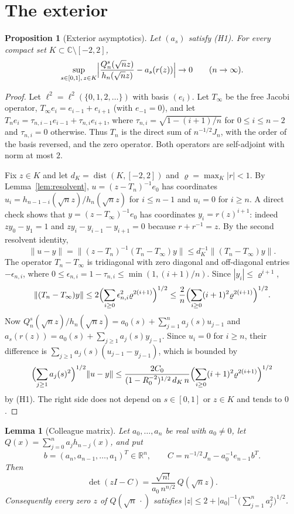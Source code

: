 \documentclass[11pt]{amsart}
\newtheorem{proposition}[theorem]{Proposition}
\newtheorem{lemma}[theorem]{Lemma}
\theoremstyle{definition}
\theoremstyle{remark}
\numberwithin{equation}{section}
\newcommand{\C}{\mathbb{C}}
\newcommand{\R}{\mathbb{R}}
\DeclareMathOperator{\dist}{dist}
\begin{document}
\section{The exterior}\label{sec:exterior}

\begin{proposition}[Exterior asymptotics]\label{prop:exterior}
Let $(a_s)$ satisfy (H1). For every compact set $K\subset\C\setminus[-2,2]$,
\[
\sup_{s\in[0,1],\,z\in K}\Bigl|\frac{Q_n^s(\sqrt nz)}{h_n(\sqrt nz)}-a_s(r(z))\Bigr|\to0\qquad(n\to\infty).
\]
\end{proposition}

\begin{proof}
Let $\ell^2=\ell^2(\{0,1,2,\dots\})$ with basis $(e_i)$. Let $T_\infty$ be the free Jacobi operator, $T_\infty e_i=e_{i-1}+e_{i+1}$ (with $e_{-1}=0$), and let $T_n e_i=\tau_{n,i-1}e_{i-1}+\tau_{n,i}e_{i+1}$, where $\tau_{n,i}=\sqrt{1-(i+1)/n}$ for $0\le i\le n-2$ and $\tau_{n,i}=0$ otherwise. Thus $T_n$ is the direct sum of $n^{-1/2}J_n$, with the order of the basis reversed, and the zero operator. Both operators are self-adjoint with norm at most $2$.

Fix $z\in K$ and let $d_K=\dist(K,[-2,2])$ and $\varrho=\max_K|r|<1$. By Lemma~\ref{lem:resolvent}, $u=(z-T_n)^{-1}e_0$ has coordinates $u_i=h_{n-1-i}(\sqrt nz)/h_n(\sqrt nz)$ for $i\le n-1$ and $u_i=0$ for $i\ge n$. A direct check shows that $y=(z-T_\infty)^{-1}e_0$ has coordinates $y_i=r(z)^{i+1}$: indeed $zy_0-y_1=1$ and $zy_i-y_{i-1}-y_{i+1}=0$ because $r+r^{-1}=z$. By the second resolvent identity,
\[
\|u-y\|=\|(z-T_n)^{-1}(T_n-T_\infty)y\|\le d_K^{-1}\|(T_n-T_\infty)y\|.
\]
The operator $T_n-T_\infty$ is tridiagonal with zero diagonal and off-diagonal entries $-\epsilon_{n,i}$, where $0\le\epsilon_{n,i}=1-\tau_{n,i}\le\min(1,(i+1)/n)$. Since $|y_i|\le\varrho^{i+1}$,
\[
\|(T_n-T_\infty)y\|\le2\Bigl(\sum_{i\ge0}\epsilon_{n,i}^2\varrho^{2(i+1)}\Bigr)^{1/2}\le\frac2n\Bigl(\sum_{i\ge0}(i+1)^2\varrho^{2(i+1)}\Bigr)^{1/2}.
\]
Now $Q_n^s(\sqrt nz)/h_n(\sqrt nz)=a_0(s)+\sum_{j=1}^{n}a_j(s)u_{j-1}$ and $a_s(r(z))=a_0(s)+\sum_{j\ge1}a_j(s)y_{j-1}$. Since $u_i=0$ for $i\ge n$, their difference is $\sum_{j\ge1}a_j(s)(u_{j-1}-y_{j-1})$, which is bounded by
\[
\Bigl(\sum_{j\ge1}a_j(s)^2\Bigr)^{1/2}\|u-y\|\le\frac{2C_0}{(1-R_0^{-2})^{1/2}\,d_K\,n}\Bigl(\sum_{i\ge0}(i+1)^2\varrho^{2(i+1)}\Bigr)^{1/2}
\]
by (H1). The right side does not depend on $s\in[0,1]$ or $z\in K$ and tends to $0$.
\end{proof}

\begin{lemma}[Colleague matrix]\label{lem:colleague}
Let $a_0,\dots,a_n$ be real with $a_0\neq0$, let $Q(x)=\sum_{j=0}^{n}a_jh_{n-j}(x)$, and put
\[
b=(a_n,a_{n-1},\dots,a_1)^T\in\R^n,\qquad C=n^{-1/2}J_n-a_0^{-1}e_{n-1}b^T .
\]
Then
\[
\det(zI-C)=\frac{\sqrt{n!}}{a_0\,n^{n/2}}\,Q(\sqrt nz).
\]
Consequently every zero $z$ of $Q(\sqrt n\,\cdot)$ satisfies $|z|\le2+|a_0|^{-1}\bigl(\sum_{j=1}^{n}a_j^2\bigr)^{1/2}$.
\end{lemma}
\end{document}
